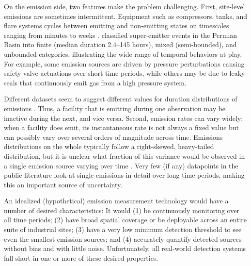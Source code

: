\documentclass[numsec,webpdf,modern,mediumone]{oup-authoring-template}
\begin{document}

On the emission side, two features make the problem challenging. First, site-level emissions are sometimes intermittent. Equipment such as compressors, tanks, and flare systems cycles between emitting and non-emitting states on timescales ranging from minutes to weeks \citep{Cusworth2021, Daniels2024}. \citet{Cusworth2026NatComms} classified super-emitter events in the Permian Basin into finite (median duration 2.4--145 hours), mixed (semi-bounded), and unbounded categories, illustrating the wide range of temporal behaviors at play. For example, some emission sources are driven by pressure perturbations causing safety valve actuations over short time periods, while others may be due to leaky seals that continuously emit gas from a high pressure system.

Different datasets seem to suggest different values for duration distributions of emissions \citep{Hodshire2025}. Thus, a facility that is emitting during one observation may be inactive during the next, and vice versa. Second, emission rates can vary widely: when a facility does emit, its instantaneous rate is not always a fixed value but can possibly vary over several orders of magnitude across time. Emissions distributions on the whole typically follow a right-skewed, heavy-tailed distribution, but it is unclear what fraction of this variance would be observed in a single emission source varying over time \citep{Brandt2014, ZavalaAraiza2015, Brandt2016, Duren2019, Sherwin2024Nature}. Very few (if any) datapoints in the public literature look at single emissions in detail over long time periods, making this an important source of uncertainty.


An idealized (hypothetical) emission measurement technology would have a number of desired characteristics: It would (1) be continuously monitoring over all time periods; (2) have broad spatial coverage or be deployable across an entire suite of industrial sites; (3) have a very low minimum detection threshold to see even the smallest emission sources; and (4) accurately quantify detected sources without bias and with little noise. Unfortunately, all real-world detection systems fall short in one or more of these desired properties.
\end{document}

